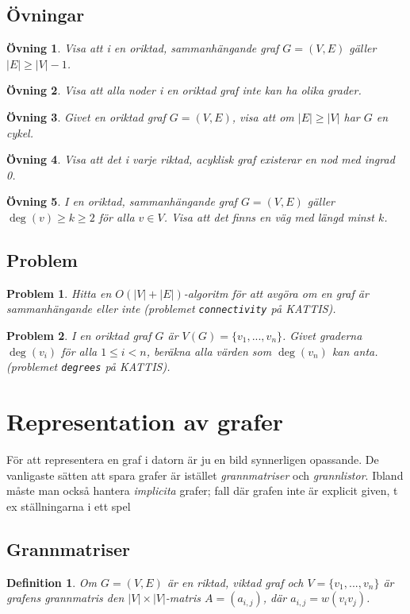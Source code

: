 \documentclass[10pt,a4paper]{article}
\newtheorem{defn}{Definition}
\theoremstyle{problem}
\newtheorem{problem}{Problem}
\newtheorem{exercise}{Övning}
\begin{document}
\subsection{Övningar}
\begin{exercise}
Visa att i en oriktad, sammanhängande graf $G = (V, E)$ gäller $|E| \ge |V| - 1$.
\end{exercise}
\begin{exercise}
Visa att alla noder i en oriktad graf inte kan ha olika grader.
\end{exercise}
\begin{exercise}
Givet en oriktad graf $G = (V, E)$, visa att om $|E| \ge |V|$ har $G$ en cykel.
\end{exercise}
\begin{exercise}
Visa att det i varje riktad, acyklisk graf existerar en nod med ingrad 0.
\end{exercise}
\begin{exercise}
I en oriktad, sammanhängande graf $G = (V, E)$ gäller $\deg(v) \ge k \ge 2$ för alla $v \in V$. Visa att det finns en väg med längd minst $k$.
\end{exercise}

\subsection{Problem}
\begin{problem}
Hitta en $O(|V| + |E|)$-algoritm för att avgöra om en graf är sammanhängande eller inte (problemet \texttt{connectivity} på KATTIS).
\end{problem}
\begin{problem}
I en oriktad graf $G$ är $V(G) = \{v_1, ..., v_n\}$. Givet graderna $\deg(v_i)$ för alla $1 \le i < n$,
beräkna alla värden som $\deg(v_n)$ kan anta. (problemet \texttt{degrees} på KATTIS).
\end{problem}

\section{Representation av grafer}
För att representera en graf i datorn är ju en bild synnerligen opassande. De vanligaste sätten att spara grafer är istället \emph{grannmatriser} och \emph{grannlistor}.
Ibland måste man också hantera \emph{implicita} grafer; fall där grafen inte är explicit given, t ex ställningarna i ett spel

\subsection{Grannmatriser}
\begin{defn}
Om $G = (V, E)$ är en riktad, viktad graf och $V = \{v_1, ..., v_n\}$ är grafens \emph{grannmatris}  den $|V| \times |V|$-matris $A = (a_{i,j})$, där $a_{i,j} = w(v_i v_j)$.
\end{defn}
\end{document}
